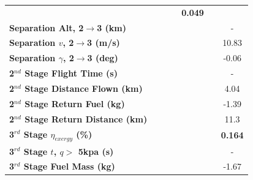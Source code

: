 \begin{table}[ht]
\begin{tabular}{l c c c c c c}
		& \textbf{\secondExergyEffIspStandard}
		& \textbf{\secondExergyEffIspOneHundredFive}
		& \textbf{\secondExergyEffIspOneHundredTen}
		& \textbf{0.049}
		\\
		\textbf{Separation Alt, 2$\rightarrow$3 (km)}
		& \secondthirdSeparationAltIspNinety
		& \secondthirdSeparationAltIspNinetyFive
		& \secondthirdSeparationAltIspStandard
		& \secondthirdSeparationAltIspOneHundredFive
		& \secondthirdSeparationAltIspOneHundredTen
		& -
		\\
		\textbf{Separation $v$, 2$\rightarrow$3 (m/s)}
		& \secondthirdSeparationvIspNinety
		& \secondthirdSeparationvIspNinetyFive
		& \secondthirdSeparationvIspStandard
		& \secondthirdSeparationvIspOneHundredFive
		& \secondthirdSeparationvIspOneHundredTen
		&10.83
		\\
		\textbf{Separation $\gamma$, 2$\rightarrow$3 (deg)}
		& \secondthirdSeparationgammaIspNinety
		& \secondthirdSeparationgammaIspNinetyFive
		& \secondthirdSeparationgammaIspStandard
		& \secondthirdSeparationgammaIspOneHundredFive
		& \secondthirdSeparationgammaIspOneHundredTen
		&-0.06
		\\
		\textbf{2$^{nd}$ Stage Flight Time (s)}
		& \secondFlightTimeIspNinety
		& \secondFlightTimeIspNinetyFive
		& \secondFlightTimeIspStandard
		& \secondFlightTimeIspOneHundredFive
		& \secondFlightTimeIspOneHundredTen
		& -
		\\
		\textbf{2$^{nd}$ Stage Distance Flown (km)}
		& \SecondDistIspNinety
		& \SecondDistIspNinetyFive
		& \SecondDistIspStandard
		& \SecondDistIspOneHundredFive
		& \SecondDistIspOneHundredTen
		&4.04
		\\
		\textbf{2$^{nd}$ Stage Return Fuel (kg)}
		& \returnFuelIspNinety
		& \returnFuelIspNinetyFive
		& \returnFuelIspStandard
		& \returnFuelIspOneHundredFive
		& \returnFuelIspOneHundredTen
		&-1.39
		\\
		\textbf{2$^{nd}$ Stage Return Distance (km)}
		& \returnDistIspNinety
		& \returnDistIspNinetyFive
		& \returnDistIspStandard
		& \returnDistIspOneHundredFive
		& \returnDistIspOneHundredTen
		&11.3
		\\
		\hline 
		\textbf{3$^{rd}$ Stage $\eta_{exergy}$ (\%)}
		& \textbf{\thirddExergyEffIspNinety}
		& \textbf{\thirddExergyEffIspNinetyFive}
		& \textbf{\thirddExergyEffIspStandard}
		& \textbf{\thirddExergyEffIspOneHundredFive}
		& \textbf{\thirddExergyEffIspOneHundredTen}
		& \textbf{0.164}
		\\
		\textbf{3$^{rd}$ Stage $t$, $q >$ 5kpa (s)}
		& \thirdqOverFiveIspNinety
		& \thirdqOverFiveIspNinetyFive
		& \thirdqOverFiveIspStandard
		& \thirdqOverFiveIspOneHundredFive
		& \thirdqOverFiveIspOneHundredTen
		& -
		\\
		\textbf{3$^{rd}$ Stage Fuel Mass (kg)}
		& \thirdmFuelIspNinety
		& \thirdmFuelIspNinetyFive
		& \thirdmFuelIspStandard
		& \thirdmFuelIspOneHundredFive
		& \thirdmFuelIspOneHundredTen
		&-1.67
		\\
		\hline 
	\end{tabular} 
	

\end{table}
